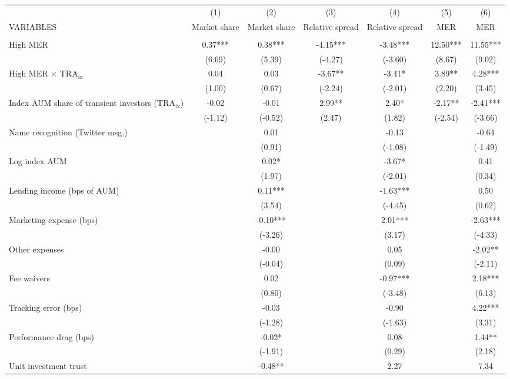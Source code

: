 \documentclass[]{article}
\begin{document}
\begin{tabular}{lcccccc} \hline
 & (1) & (2) & (3) & (4) & (5) & (6) \\
VARIABLES & Market share & Market share & Relative spread & Relative spread & MER & MER \\ \hline
 &  &  &  &  &  &  \\
High MER & 0.37*** & 0.38*** & -4.15*** & -3.48*** & 12.50*** & 11.55*** \\
 & (6.69) & (5.39) & (-4.27) & (-3.60) & (8.67) & (9.02) \\
High MER $\times$ $\text{TRA}_\text{ix}$ & 0.04 & 0.03 & -3.67** & -3.41* & 3.89** & 4.28*** \\
 & (1.00) & (0.67) & (-2.24) & (-2.01) & (2.20) & (3.45) \\
Index AUM share of transient investors ($\text{TRA}_\text{ix}$) & -0.02 & -0.01 & 2.99** & 2.40* & -2.17** & -2.41*** \\
 & (-1.12) & (-0.52) & (2.47) & (1.82) & (-2.54) & (-3.66) \\
Name recognition (Twitter msg.) &  & 0.01 &  & -0.13 &  & -0.64 \\
 &  & (0.91) &  & (-1.08) &  & (-1.49) \\
Log index AUM &  & 0.02* &  & -3.67* &  & 0.41 \\
 &  & (1.97) &  & (-2.01) &  & (0.34) \\
Lending income (bps of AUM) &  & 0.11*** &  & -1.63*** &  & 0.50 \\
 &  & (3.54) &  & (-4.45) &  & (0.62) \\
Marketing expense (bps) &  & -0.10*** &  & 2.01*** &  & -2.63*** \\
 &  & (-3.26) &  & (3.17) &  & (-4.33) \\
Other expenses &  & -0.00 &  & 0.05 &  & -2.02** \\
 &  & (-0.04) &  & (0.09) &  & (-2.11) \\
Fee waivers &  & 0.02 &  & -0.97*** &  & 2.18*** \\
 &  & (0.80) &  & (-3.48) &  & (6.13) \\
Tracking error (bps) &  & -0.03 &  & -0.90 &  & 4.22*** \\
 &  & (-1.28) &  & (-1.63) &  & (3.31) \\
Performance drag (bps) &  & -0.02* &  & 0.08 &  & 1.44** \\
 &  & (-1.91) &  & (0.29) &  & (2.18) \\
Unit investment trust &  & -0.48** &  & 2.27 &  & 7.34 \\

\end{tabular}
\end{document}
